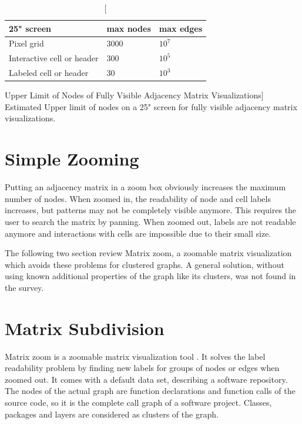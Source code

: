  
\begin{table}[]
\centering
\begin{tabular}{|l|l|l|}
\hline
25" screen                 & max nodes & max edges                \\ \hline
Pixel grid                 & 3000      & $10^7$                     \\ \hline
Interactive cell or header & 300       & $10^5$                     \\ \hline
Labeled cell or header     & 30        & $10^3$                     \\ \hline
\end{tabular}
\caption
  [Upper Limit of Nodes of Fully Visible Adjacency Matrix Visualizations]
  {Estimated Upper limit of nodes on a 25" screen for fully visible adjacency matrix visualizations.}
  \label{table_upperlimit}
\end{table}



\section{Simple Zooming}
Putting an adjacency matrix in a zoom box obviously increases the maximum number of nodes. 
When zoomed in, the readability of node and cell labels increases, but patterns may not be completely visible anymore. This requires the user to search the matrix by panning. When zoomed out, labels are not readable anymore and interactions with cells are impossible due to their small size. 

The following two section review Matrix zoom, a zoomable matrix visualization which avoids these problems for clustered graphs. A general solution, without using known additional properties of the graph like its clusters, was not found in the survey.

\section{Matrix Subdivision}

Matrix zoom is a zoomable matrix visualization tool \citep{ham-ivis-2003}. It solves the label readability problem by finding new labels for groups of nodes or edges when zoomed out. It comes with a default data set, describing a software repository. The nodes of the actual graph are function declarations and function calls of the source code, so it is the complete call graph of a software project. Classes, packages and layers are considered as clusters of the graph. 

